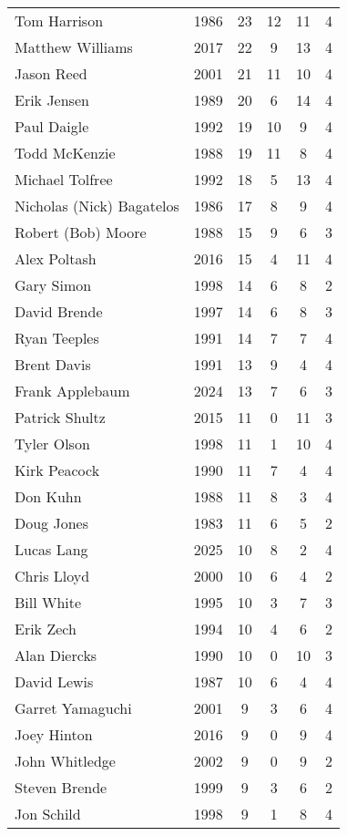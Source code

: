 \begin{longtable}{lccccc}
    Tom Harrison & 1986 & 23 & 12 & 11 & 4 \\
    Matthew Williams & 2017 & 22 & 9 & 13 & 4 \\
    Jason Reed & 2001 & 21 & 11 & 10 & 4 \\
    Erik Jensen & 1989 & 20 & 6 & 14 & 4 \\
    Paul Daigle & 1992 & 19 & 10 & 9 & 4 \\
    Todd McKenzie & 1988 & 19 & 11 & 8 & 4 \\
    Michael Tolfree & 1992 & 18 & 5 & 13 & 4 \\
    Nicholas (Nick) Bagatelos & 1986 & 17 & 8 & 9 & 4 \\
    Robert (Bob) Moore & 1988 & 15 & 9 & 6 & 3 \\
    Alex Poltash & 2016 & 15 & 4 & 11 & 4 \\
    Gary Simon & 1998 & 14 & 6 & 8 & 2 \\
    David Brende & 1997 & 14 & 6 & 8 & 3 \\
    Ryan Teeples & 1991 & 14 & 7 & 7 & 4 \\
    Brent Davis & 1991 & 13 & 9 & 4 & 4 \\
    Frank Applebaum & 2024 & 13 & 7 & 6 & 3 \\
    Patrick Shultz & 2015 & 11 & 0 & 11 & 3 \\
    Tyler Olson & 1998 & 11 & 1 & 10 & 4 \\
    Kirk Peacock & 1990 & 11 & 7 & 4 & 4 \\
    Don Kuhn & 1988 & 11 & 8 & 3 & 4 \\
    Doug Jones & 1983 & 11 & 6 & 5 & 2 \\
    Lucas Lang & 2025 & 10 & 8 & 2 & 4 \\
    Chris Lloyd & 2000 & 10 & 6 & 4 & 2 \\
    Bill White & 1995 & 10 & 3 & 7 & 3 \\
    Erik Zech & 1994 & 10 & 4 & 6 & 2 \\
    Alan Diercks & 1990 & 10 & 0 & 10 & 3 \\
    David Lewis & 1987 & 10 & 6 & 4 & 4 \\
    Garret Yamaguchi & 2001 & 9 & 3 & 6 & 4 \\
    Joey Hinton & 2016 & 9 & 0 & 9 & 4 \\
    John Whitledge & 2002 & 9 & 0 & 9 & 2 \\
    Steven Brende & 1999 & 9 & 3 & 6 & 2 \\
    Jon Schild & 1998 & 9 & 1 & 8 & 4 \\

\end{longtable}
